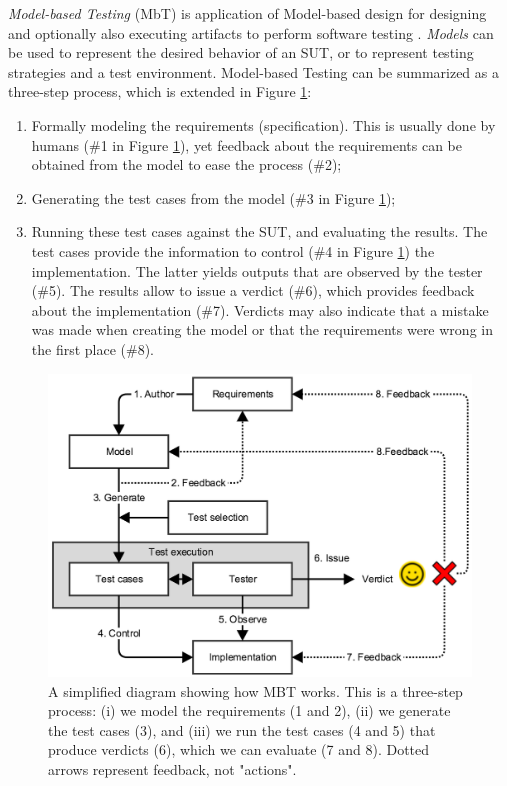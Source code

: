 \textit{Model-based Testing} (MbT) is application of Model-based
design for designing and optionally also executing artifacts to
perform software testing \cite{Jorgensen:1995:STC:526521}.
\emph{Models} can be used to represent the desired behavior of an
SUT, or to represent testing strategies and a test environment.
Model-based Testing can be summarized as a three-step process,
which is extended in Figure \ref{fig:mbt}:

\begin{enumerate}
    \item Formally modeling the requirements (specification).
        This is usually done by humans (\#1 in Figure
        \ref{fig:mbt}), yet feedback about the requirements can
        be obtained from the model to ease the process (\#2);

    \item Generating the test cases from the model (\#3 in Figure
        \ref{fig:mbt});

    \item Running these test cases against the SUT, and
        evaluating the results. The test cases provide the
        information to control (\#4 in Figure \ref{fig:mbt}) the
        implementation. The latter yields outputs that are
        observed by the tester (\#5).  The results allow to issue
        a verdict (\#6), which provides feedback about the
        implementation (\#7). Verdicts may also indicate that a
        mistake was made when creating the model or that the
        requirements were wrong in the first place (\#8).
\end{enumerate}

\begin{figure}[ht]
    \begin{center}
    \includegraphics[width=1.0\linewidth]{figures/mbt.png}
    \end{center}

    \caption{A simplified diagram showing how MBT works. This is
    a three-step process: (i) we model the requirements (1 and
    2), (ii) we generate the test cases (3), and (iii) we run the
    test cases (4 and 5) that produce verdicts (6), which we can
    evaluate (7 and 8). Dotted arrows represent feedback, not
    "actions".}
    \label{fig:mbt}
\end{figure}

